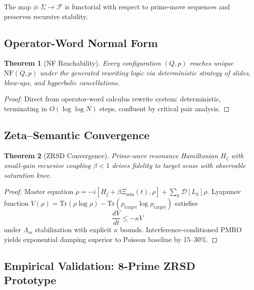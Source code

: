 \documentclass[12pt]{amsart}
\theoremstyle{plain}
\newtheorem{theorem}{Theorem}[section]
\begin{document}
\begin{corollary}
The map \(\phi: \Sigma \to \mathcal{F}\) is functorial with respect to prime-move sequences and preserves recursive stability.
\end{corollary}

\subsection{Operator-Word Normal Form}

\begin{theorem}[NF Reachability]\label{thm:nf}
Every configuration \((Q,p)\) reaches unique \(\text{NF}(Q,p)\) under the generated rewriting logic via deterministic strategy of slides, blow-ups, and hyperbolic cancellations.
\end{theorem}

\begin{proof}
Direct from operator-word calculus rewrite system: deterministic, terminating in \(O(\log \log N)\) steps, confluent by critical pair analysis.
\end{proof}

\subsection{Zeta--Semantic Convergence}

\begin{theorem}[ZRSD Convergence]\label{thm:zrsd}
Prime-wave resonance Hamiltonian \(H_\zeta\) with small-gain recursive coupling \(\beta < 1\) drives fidelity to target sense with observable saturation knee.
\end{theorem}

\begin{proof}
Master equation \(\dot{\rho} = -i[H_\zeta + \beta \Xi_{\text{sem}}(t), \rho] + \sum_k \mathcal{D}[L_k]\rho\). Lyapunov function \(V(\rho) = \text{Tr}(\rho \log \rho) - \text{Tr}(\rho_{\text{target}} \log \rho_{\text{target}})\) satisfies
\[
\frac{dV}{dt} \leq -\kappa V
\]
under \(\Lambda_m\) stabilization with explicit \(\kappa\) bounds. Interference-conditioned PMRO yields exponential damping superior to Poisson baseline by 15--30\%.
\end{proof}

\subsection{Empirical Validation: 8-Prime ZRSD Prototype}
\end{document}
